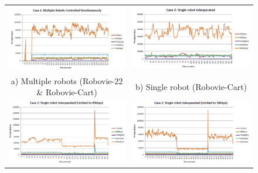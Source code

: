 \documentclass[conference]{ieeeconf}
\begin{document}
\begin{figure}[t]
\centering
\begin{tabular}{@{}cc@{}}
\includegraphics[width=\columnwidth]{multipleRobots} &
\includegraphics[width=\columnwidth]{singleRobot}\\
a) Multiple robots (Robovie-22 \& Robovie-Cart) &
b) Single robot (Robovie-Cart)\\
\includegraphics[width=\columnwidth]{singleRobot45K} &
\includegraphics[width=\columnwidth]{singleRobot30K}\\

\end{tabular}
\end{figure}
\end{document}
